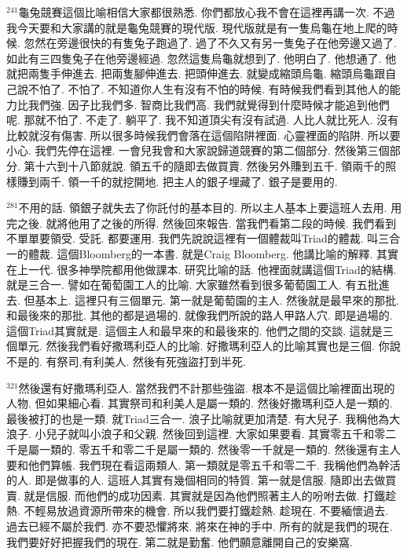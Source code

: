 \documentclass{book}
\begin{document}
$^{241}$龜兔競賽這個比喻相信大家都很熟悉.
你們都放心我不會在這裡再講一次.
不過我今天要和大家講的就是龜兔競賽的現代版.
現代版就是有一隻烏龜在地上爬的時候.
忽然在旁邊很快的有隻兔子跑過了.
過了不久又有另一隻兔子在他旁邊又過了.
如此有三四隻兔子在他旁邊經過.
忽然這隻烏龜就想到了.
他明白了.
他想通了.
他就把兩隻手伸進去.
把兩隻腳伸進去.
把頭伸進去.
就變成縮頭烏龜.
縮頭烏龜跟自己說不怕了.
不怕了.
不知道你人生有沒有不怕的時候.
有時候我們看到其他人的能力比我們強.
因子比我們多.
智商比我們高.
我們就覺得到什麼時候才能追到他們呢.
那就不怕了.
不走了.
躺平了.
我不知道頂尖有沒有試過.
人比人就比死人.
沒有比較就沒有傷害.
所以很多時候我們會落在這個陷阱裡面.
心靈裡面的陷阱.
所以要小心.
我們先停在這裡.
一會兒我會和大家說歸道競賽的第二個部分.
然後第三個部分.
第十六到十八節就說.
領五千的隨即去做買賣.
然後另外賺到五千.
領兩千的照樣賺到兩千.
領一千的就挖開地.
把主人的銀子埋藏了.
銀子是要用的.

$^{281}$不用的話.
領銀子就失去了你託付的基本目的.
所以主人基本上要這班人去用.
用完之後.
就將他用了之後的所得.
然後回來報告.
當我們看第二段的時候.
我們看到不單單要領受.
受託.
都要運用.
我們先說說這裡有一個體裁叫Triad的體裁.
叫三合一的體裁.
這個Bloomberg的一本書.
就是Craig Bloomberg.
他講比喻的解釋.
其實在上一代.
很多神學院都用他做課本.
研究比喻的話.
他裡面就講這個Triad的結構.
就是三合一.
譬如在葡萄園工人的比喻.
大家雖然看到很多葡萄園工人.
有五批進去.
但基本上.
這裡只有三個單元.
第一就是葡萄園的主人.
然後就是最早來的那批.
和最後來的那批.
其他的都是過場的.
就像我們所說的路人甲路人穴.
即是過場的.
這個Triad其實就是.
這個主人和最早來的和最後來的.
他們之間的交談.
這就是三個單元.
然後我們看好撒瑪利亞人的比喻.
好撒瑪利亞人的比喻其實也是三個.
你說不是的.
有祭司,有利美人.
然後有死強盜打到半死.

$^{321}$然後還有好撒瑪利亞人.
當然我們不計那些強盜.
根本不是這個比喻裡面出現的人物.
但如果細心看.
其實祭司和利美人是屬一類的.
然後好撒瑪利亞人是一類的.
最後被打的也是一類.
就Triad三合一.
浪子比喻就更加清楚.
有大兒子.
我稱他為大浪子.
小兒子就叫小浪子和父親.
然後回到這裡.
大家如果要看.
其實零五千和零二千是屬一類的.
零五千和零二千是屬一類的.
然後零一千就是一類的.
然後還有主人要和他們算帳.
我們現在看這兩類人.
第一類就是零五千和零二千.
我稱他們為幹活的人.
即是做事的人.
這班人其實有幾個相同的特質.
第一就是信服.
隨即出去做買賣.
就是信服.
而他們的成功因素.
其實就是因為他們照著主人的吩咐去做.
打鐵趁熱.
不輕易放過資源所帶來的機會.
所以我們要打鐵趁熱.
趁現在.
不要緬懷過去.
過去已經不屬於我們.
亦不要恐懼將來.
將來在神的手中.
所有的就是我們的現在.
我們要好好把握我們的現在.
第二就是勤奮.
他們願意離開自己的安樂窩.
\end{document}
